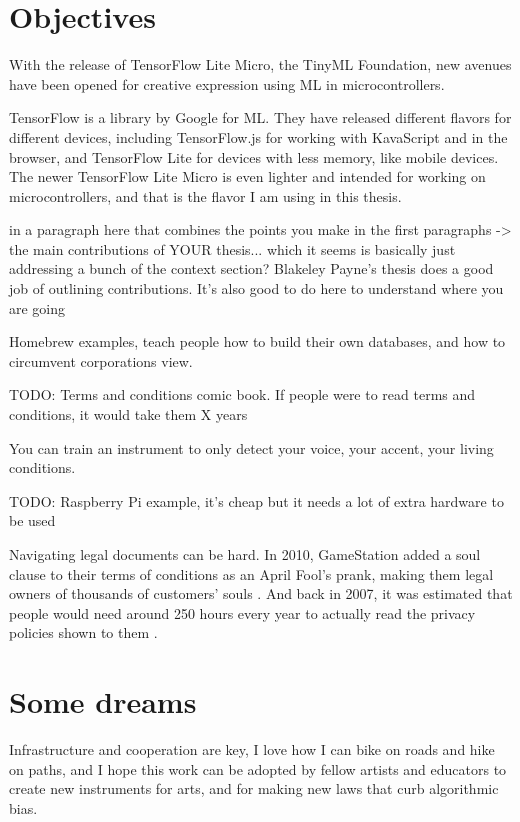 \section{Objectives}

With the release of TensorFlow Lite Micro, the TinyML Foundation, new avenues have been opened for creative expression using \acrshort{ML} in microcontrollers.

TensorFlow is a library by Google for \acrshort{ML}. They have released different flavors for different devices, including TensorFlow.js for working with KavaScript and in the browser, and TensorFlow Lite for devices with less memory, like mobile devices. The newer TensorFlow Lite Micro is even lighter and intended for working on microcontrollers, and that is the flavor I am using in this thesis.

in a paragraph here that combines the points you make in the first paragraphs -> the main contributions of YOUR thesis... which it seems is basically just addressing a bunch of the context section? Blakeley Payne's thesis does a good job of outlining contributions. It's also good to do here to understand where you are going

Homebrew examples, teach people how to build their own databases, and how to circumvent corporations view.

TODO: Terms and conditions comic book. If people were to read terms and conditions, it would take them X years

You can train an instrument to only detect your voice, your accent, your living conditions.

TODO: Raspberry Pi example, it’s cheap but it needs a lot of extra hardware to be used

Navigating legal documents can be hard. In 2010, GameStation added a soul clause to their terms of conditions as an April Fool's prank, making them legal owners of thousands of customers' souls \cite{website-huffpost-gamestation-soul-clause}. And back in 2007, it was estimated that people would need around 250 hours every year to actually read the privacy policies shown to them \cite{article-cost-of-reading-privacy-policies}.

\section{Some dreams}

Infrastructure and cooperation are key, I love how I can bike on roads and hike on paths, and I hope this work can be adopted by fellow artists and educators to create new instruments for arts, and for making new laws that curb algorithmic bias.

